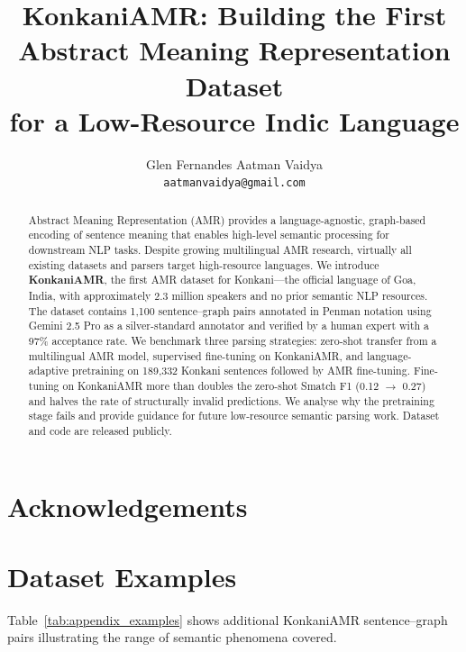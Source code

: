 \documentclass[11pt]{article}
\title{KonkaniAMR: Building the First Abstract Meaning Representation Dataset\\
       for a Low-Resource Indic Language}
\author{Glen Fernandes \quad Aatman Vaidya \\
  \texttt{aatmanvaidya@gmail.com}}
\begin{document}
\maketitle

\begin{abstract}
Abstract Meaning Representation (AMR) provides a language-agnostic, graph-based
encoding of sentence meaning that enables high-level semantic processing for
downstream NLP tasks. Despite growing multilingual AMR research, virtually all
existing datasets and parsers target high-resource languages. We introduce
\textbf{KonkaniAMR}, the first AMR dataset for Konkani—the official language of
Goa, India, with approximately 2.3 million speakers and no prior semantic NLP
resources. The dataset contains 1,100 sentence–graph pairs annotated in Penman
notation using Gemini 2.5 Pro as a silver-standard annotator and verified by a
human expert with a 97\% acceptance rate. We benchmark three parsing strategies:
zero-shot transfer from a multilingual AMR model, supervised fine-tuning on
KonkaniAMR, and language-adaptive pretraining on 189,332 Konkani sentences
followed by AMR fine-tuning. Fine-tuning on KonkaniAMR more than doubles the
zero-shot Smatch F1 (0.12 $\to$ 0.27) and halves the rate of structurally invalid
predictions. We analyse why the pretraining stage fails and provide guidance for
future low-resource semantic parsing work. Dataset and code are released publicly.
\end{abstract}









\section*{Acknowledgements}



\appendix

\section{Dataset Examples}
\label{sec:appendix_examples}

Table~\ref{tab:appendix_examples} shows additional KonkaniAMR sentence–graph
pairs illustrating the range of semantic phenomena covered.
\end{document}
